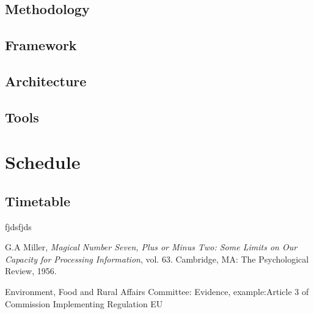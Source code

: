 \documentclass[a4paper, 11pt]{article}
\begin{document}
\subsection{Methodology}
\subsection{Framework}
\subsection{Architecture}
\subsection{Tools}

\clearpage

\section{Schedule}
\subsection{Timetable}

\clearpage

\begin{thebibliography}{11}

	fjdsfjds
	
	G.A Miller, \emph{Magical Number Seven, Plus or Minus Two: Some Limits on Our Capacity for Processing Information}, vol. 63. Cambridge, MA: The Psychological Review, 1956.

Environment, Food and Rural Affairs Committee: Evidence,
example:Article 3 of Commission Implementing Regulation EU


\end{thebibliography}
\end{document}
